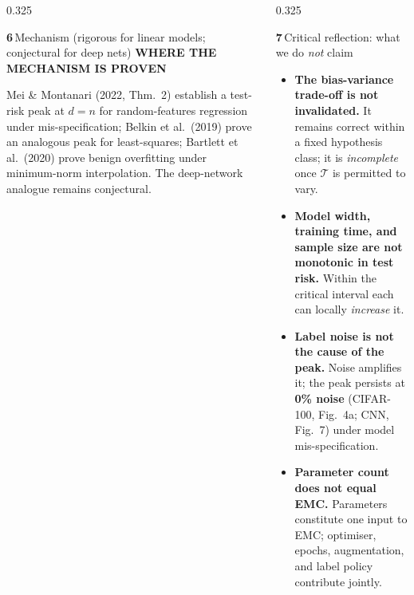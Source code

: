 \documentclass[final]{beamer}
\newcommand{\sectnum}[1]{\textcolor{accentgold}{\bfseries #1}\,}
\newcommand{\kw}[1]{\textcolor{uompurple}{\textbf{#1}}}
\newcommand{\eyebrow}[1]{{\color{uompurple}\scriptsize\bfseries\MakeUppercase{#1}}\par\vspace{-0.2ex}}
\newcommand{\T}{\mathcal{T}}
\begin{document}
\begin{frame}[t]{}
\begin{columns}[T,onlytextwidth]
\begin{column}{0.325\linewidth}
\begin{block}{\sectnum{6}Mechanism (rigorous for linear models; conjectural for deep nets)}
\justifying
\vspace{0.3ex}
\eyebrow{Where the mechanism is proven}
Mei \& Montanari (2022, Thm.~2) establish a test-risk peak at \(d{=}n\) for random-features regression under mis-specification; Belkin et al.\ (2019) prove an analogous peak for least-squares; Bartlett et al.\ (2020) prove benign overfitting under minimum-norm interpolation. The deep-network analogue remains conjectural.
\end{block}
\end{column}\hspace{0.005\linewidth}%

\begin{column}{0.325\linewidth}
\begin{block}{\sectnum{7}Critical reflection: what we do \emph{not} claim}
\begin{itemize}\setlength\itemsep{0.4ex}
\item \kw{The bias-variance trade-off is not invalidated.} It remains correct within a fixed hypothesis class; it is \emph{incomplete} once \(\T\) is permitted to vary.
\item \kw{Model width, training time, and sample size are not monotonic in test risk.} Within the critical interval each can locally \emph{increase} it.
\item \kw{Label noise is not the cause of the peak.} Noise amplifies it; the peak persists at \kw{0\% noise} (CIFAR-100, Fig.~4a; CNN, Fig.~7) under model mis-specification.
\item \kw{Parameter count does not equal EMC.} Parameters constitute one input to EMC; optimiser, epochs, augmentation, and label policy contribute jointly.
\end{itemize}
\end{block}
\end{column}\hspace{0.005\linewidth}%


\end{columns}
\end{frame}
\end{document}
